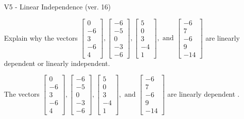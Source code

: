 \begin{exercise}
  \begin{exerciseTitle}V5 - Linear Independence (ver. 16)\end{exerciseTitle}
  \begin{exerciseStatement}
    Explain why the vectors \(\left[\begin{array}{r}
0 \\
-6 \\
3 \\
-6 \\
4
\end{array}\right] , \left[\begin{array}{r}
-6 \\
-5 \\
0 \\
-3 \\
-6
\end{array}\right] , \left[\begin{array}{r}
5 \\
0 \\
3 \\
-4 \\
1
\end{array}\right] , \text{ and } \left[\begin{array}{r}
-6 \\
7 \\
-6 \\
9 \\
-14
\end{array}\right]\) are linearly dependent or linearly independent.	


  \end{exerciseStatement}
  \begin{exerciseAnswer}
   The vectors \(\left[\begin{array}{r}
0 \\
-6 \\
3 \\
-6 \\
4
\end{array}\right] , \left[\begin{array}{r}
-6 \\
-5 \\
0 \\
-3 \\
-6
\end{array}\right] , \left[\begin{array}{r}
5 \\
0 \\
3 \\
-4 \\
1
\end{array}\right] , \text{ and } \left[\begin{array}{r}
-6 \\
7 \\
-6 \\
9 \\
-14
\end{array}\right]\) are 
  	 linearly dependent  .
  


  \end{exerciseAnswer}
\end{exercise}